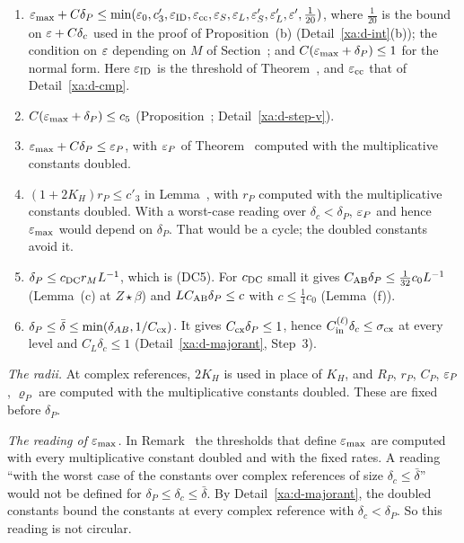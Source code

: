 \begin{detail}
\begin{enumerate}[label=(P\arabic*)]
\begin{itemize}
  \end{itemize}
\item $\varepsilon_{\max}+C\delta_P\le\min(\varepsilon_0,c'_3,\varepsilon_{\rm ID},\varepsilon_{\rm cc},\varepsilon_S,\varepsilon_L,\varepsilon'_S,\varepsilon'_L,\varepsilon',\frac1{20})$, where $\frac1{20}$ is the bound on $\varepsilon+C\delta_c$ used in the proof of Proposition~(b) (Detail~\ref{xa:d-int}(b)); the condition on $\varepsilon$ depending on $M$ of Section~; and $C(\varepsilon_{\max}+\delta_P)\le1$ for the normal form. Here $\varepsilon_{\rm ID}$ is the threshold of Theorem~, and $\varepsilon_{\rm cc}$ that of Detail~\ref{xa:d-cmp}.
\item $C(\varepsilon_{\max}+\delta_P)\le c_5$ (Proposition~; Detail~\ref{xa:d-step-v}).
\item $\varepsilon_{\max}+C\delta_P\le\varepsilon_P$, with $\varepsilon_P$ of Theorem~ computed with the multiplicative constants doubled.
\item $(1+2K_H)r_P\le c'_3$ in Lemma~, with $r_P$ computed with the multiplicative constants doubled. With a worst-case reading over $\delta_c<\delta_P$, $\varepsilon_P$ and hence $\varepsilon_{\max}$ would depend on $\delta_P$. That would be a cycle; the doubled constants avoid it.
\item $\delta_P\le c_{\rm DC}r_ML^{-1}$, which is (DC5). For $c_{\rm DC}$ small it gives $C_{\rm AB}\delta_P\le\frac1{32}c_0L^{-1}$ (Lemma~(c) at $Z\star\beta$) and $LC_{\rm AB}\delta_P\le c$ with $c\le\frac14c_0$ (Lemma~(f)).
\item $\delta_P\le\bar\delta\le\min(\delta_{AB},1/C_{\rm cx})$. It gives $C_{\rm cx}\delta_P\le1$, hence $C^{(\ell)}_{\rm in}\delta_c\le\sigma_{\rm cx}$ at every level and $C_L\delta_c\le1$ (Detail~\ref{xa:d-majorant}, Step~3).
\end{enumerate}
\emph{The radii.} At complex references, $2K_H$ is used in place of $K_H$, and $R_P$, $r_P$, $C_P$, $\varepsilon_P$, $\varrho_P$ are computed with the multiplicative constants doubled. These are fixed before $\delta_P$.

\emph{The reading of $\varepsilon_{\max}$.} In Remark~ the thresholds that define $\varepsilon_{\max}$ are computed with every multiplicative constant doubled and with the fixed rates. A reading ``with the worst case of the constants over complex references of size $\delta_c\le\bar\delta$'' would not be defined for $\delta_P\le\delta_c\le\bar\delta$. By Detail~\ref{xa:d-majorant}, the doubled constants bound the constants at every complex reference with $\delta_c<\delta_P$. So this reading is not circular.
\end{detail}

